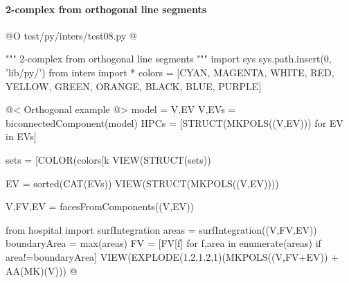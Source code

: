 \documentclass[11pt,oneside]{article}    %
\begin{document}
\paragraph{2-complex from orthogonal line segments}
@O test/py/inters/test08.py
@{""" 2-complex from orthogonal line segments """
import sys
sys.path.insert(0, 'lib/py/')
from inters import *
colors = [CYAN, MAGENTA, WHITE, RED, YELLOW, GREEN, ORANGE, BLACK, BLUE, PURPLE]

@< Orthogonal example @>
model = V,EV
V,EVs = biconnectedComponent(model)
HPCs = [STRUCT(MKPOLS((V,EV))) for EV in EVs]

sets = [COLOR(colors[k%
VIEW(STRUCT(sets))

EV = sorted(CAT(EVs))
VIEW(STRUCT(MKPOLS((V,EV))))

V,FV,EV = facesFromComponents((V,EV))

from hospital import surfIntegration
areas = surfIntegration((V,FV,EV))
boundaryArea = max(areas)
FV = [FV[f] for f,area in enumerate(areas) if area!=boundaryArea]
VIEW(EXPLODE(1.2,1.2,1)(MKPOLS((V,FV+EV)) + AA(MK)(V)))
@}
\end{document}
